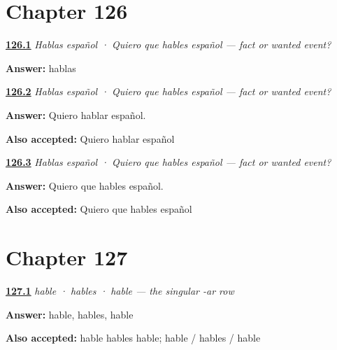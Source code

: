 \section*{Chapter 126}

\noindent\begin{minipage}[t]{\linewidth}
\raggedright
\hyperlink{review-ES-C18-quiero-que-meaning}{\textbf{126.1}} \emph{Hablas español · Quiero que hables español — fact or wanted event?}\par
\small \textbf{Answer:} hablas\par
\end{minipage}\par\medskip

\noindent\begin{minipage}[t]{\linewidth}
\raggedright
\hyperlink{review-ES-C18-quiero-que-one-doer}{\textbf{126.2}} \emph{Hablas español · Quiero que hables español — fact or wanted event?}\par
\small \textbf{Answer:} Quiero hablar español.\par
\footnotesize \textbf{Also accepted:} Quiero hablar español
\end{minipage}\par\medskip

\noindent\begin{minipage}[t]{\linewidth}
\raggedright
\hyperlink{review-ES-C18-quiero-que-two-doers}{\textbf{126.3}} \emph{Hablas español · Quiero que hables español — fact or wanted event?}\par
\small \textbf{Answer:} Quiero que hables español.\par
\footnotesize \textbf{Also accepted:} Quiero que hables español
\end{minipage}\par\medskip

\section*{Chapter 127}

\noindent\begin{minipage}[t]{\linewidth}
\raggedright
\hyperlink{review-ES-C18-subjuntivo-forms}{\textbf{127.1}} \emph{hable · hables · hable — the singular -ar row}\par
\small \textbf{Answer:} hable, hables, hable\par
\footnotesize \textbf{Also accepted:} hable hables hable; hable / hables / hable
\end{minipage}\par\medskip

